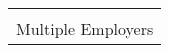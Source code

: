 \documentclass[11pt]{amsart}
\begin{document}
\begin{center}
\begin{tabular}{c}
\begin{minipage}{\textwidth}
		{\bf Tutor} \hfill {\bf 05/2014 to 05/2019}\\
		Multiple Employers
	\end{minipage}%
\end{tabular}\end{center}
\end{document}
